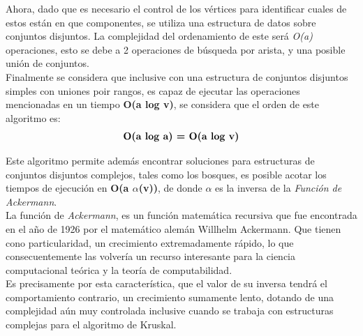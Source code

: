    Ahora, dado que es necesario el control de los vértices para identificar cuales de estos están en que componentes, se utiliza una estructura de datos sobre conjuntos disjuntos. La complejidad del ordenamiento de este será \textit{O(a)} operaciones, esto se debe a 2 operaciones de búsqueda por arista, y una posible unión de conjuntos.\\
    
    Finalmente se considera que inclusive con una estructura de conjuntos disjuntos simples con uniones poir rangos, es capaz de ejecutar las operaciones mencionadas en un tiempo \textbf{O(a log v)}, se considera que el orden de este algoritmo es:
    \begin{equation*}
        \text{\textbf{O(a log a) = O(a log v)}}
    \end{equation*}
    
    Este algoritmo permite además encontrar soluciones para estructuras de conjuntos disjuntos complejos, tales como los bosques, es posible acotar los tiempos de ejecución en \textbf{O(a $\alpha$(v))}, de donde $\alpha$ es la inversa de la \textit{Función de Ackermann}.\\
    
    La función de \textit{Ackermann}, es un función matemática recursiva que fue encontrada en el año de 1926 por el matemático alemán Willhelm Ackermann. Que tienen cono particularidad, un crecimiento extremadamente rápido, lo que consecuentemente las volvería un recurso interesante para la ciencia computacional teórica y la teoría de computabilidad.\\
    
    Es precisamente por esta característica, que el valor de su inversa tendrá el comportamiento contrario, un crecimiento sumamente lento, dotando de una complejidad aún muy controlada inclusive cuando se trabaja con estructuras complejas para el algoritmo de Kruskal.